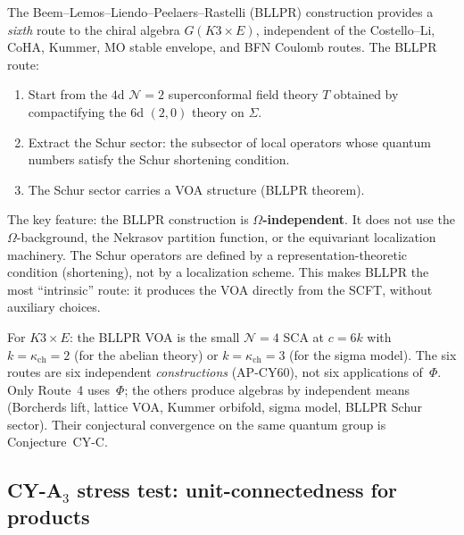 \documentclass[11pt]{article}
\newcommand{\cN}{\mathcal{N}}
\begin{document}
\begin{observation}[BLLPR = $\Omega$-independent Schur sector]
\label{obs:bllpr-sixth}
The Beem--Lemos--Liendo--Peelaers--Rastelli (BLLPR) construction
provides a \emph{sixth} route to the chiral algebra $G(K3 \times E)$,
independent of the Costello--Li, CoHA, Kummer, MO stable envelope,
and BFN Coulomb routes. The BLLPR route:
\begin{enumerate}[label=\textup{(\roman*)}]
 \item Start from the $4$d $\cN = 2$ superconformal field theory
 $T$ obtained by compactifying the $6$d $(2,0)$ theory on $\Sigma$.
 \item Extract the Schur sector: the subsector of local operators
 whose quantum numbers satisfy the Schur shortening condition.
 \item The Schur sector carries a VOA structure (BLLPR theorem).
\end{enumerate}
The key feature: the BLLPR construction is \textbf{$\Omega$-independent}.
It does not use the $\Omega$-background, the Nekrasov partition
function, or the equivariant localization machinery. The Schur
operators are defined by a representation-theoretic condition
(shortening), not by a localization scheme. This makes BLLPR the
most ``intrinsic'' route: it produces the VOA directly from the
SCFT, without auxiliary choices.

For $K3 \times E$: the BLLPR VOA is the small $\cN = 4$ SCA at
$c = 6k$ with $k = \kappa_{\mathrm{ch}} = 2$ (for the abelian theory)
or $k = \kappa_{\mathrm{ch}} = 3$ (for the sigma model). The six routes
are six independent \emph{constructions} (AP-CY60), not six applications
of~$\Phi$. Only Route~4 uses~$\Phi$; the others produce algebras by
independent means (Borcherds lift, lattice VOA, Kummer orbifold, sigma model,
BLLPR Schur sector). Their conjectural convergence on the same quantum
group is Conjecture~CY-C.
\end{observation}

\subsection{CY-A$_3$ stress test: unit-connectedness for products}
\label{subsec:cy-a3-stress}
\end{document}
